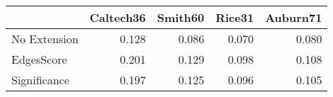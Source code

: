 \begin{tabular}{lrrrr}
\toprule
{} & Caltech36 & Smith60 & Rice31 & Auburn71 \\
\midrule
No Extension &     0.128 &   0.086 &  0.070 &    0.080 \\
EdgesScore   &     0.201 &   0.129 &  0.098 &    0.108 \\
Significance &     0.197 &   0.125 &  0.096 &    0.105 \\
\bottomrule
\end{tabular}
